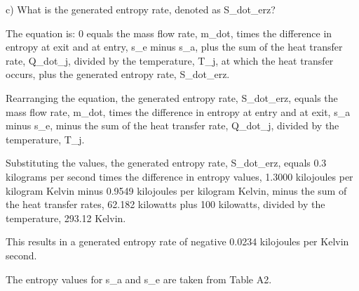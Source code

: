 c) What is the generated entropy rate, denoted as S_dot_erz?

The equation is:
0 equals the mass flow rate, m_dot, times the difference in entropy at exit and at entry, s_e minus s_a, plus the sum of the heat transfer rate, Q_dot_j, divided by the temperature, T_j, at which the heat transfer occurs, plus the generated entropy rate, S_dot_erz.

Rearranging the equation, the generated entropy rate, S_dot_erz, equals the mass flow rate, m_dot, times the difference in entropy at entry and at exit, s_a minus s_e, minus the sum of the heat transfer rate, Q_dot_j, divided by the temperature, T_j.

Substituting the values, the generated entropy rate, S_dot_erz, equals 0.3 kilograms per second times the difference in entropy values, 1.3000 kilojoules per kilogram Kelvin minus 0.9549 kilojoules per kilogram Kelvin, minus the sum of the heat transfer rates, 62.182 kilowatts plus 100 kilowatts, divided by the temperature, 293.12 Kelvin.

This results in a generated entropy rate of negative 0.0234 kilojoules per Kelvin second.

The entropy values for s_a and s_e are taken from Table A2.